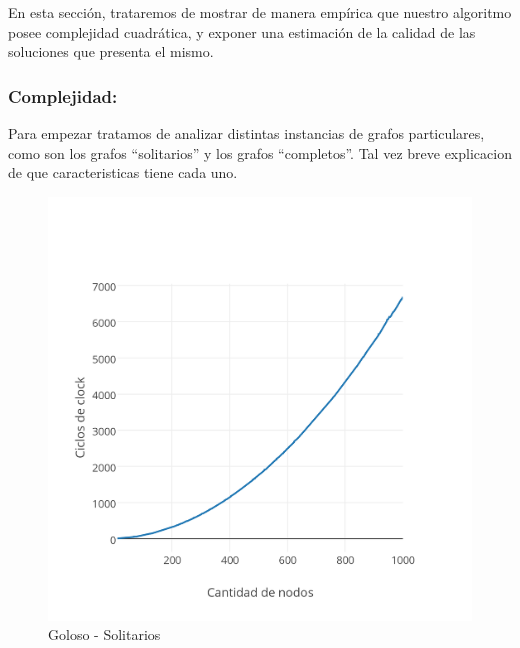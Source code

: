 En esta sección, trataremos de mostrar de manera empírica que nuestro algoritmo posee complejidad cuadrática, y exponer una estimación de la calidad de las soluciones que presenta el mismo.

\vspace*{0.6cm}

\subsubsection{Complejidad:}
\vspace*{0.3cm}

Para empezar tratamos de analizar distintas instancias de grafos particulares, como son los grafos ``solitarios'' y los grafos ``completos''. Tal vez breve explicacion de que caracteristicas tiene cada uno.

\begin{figure}[htb]
	\begin{center}
    		\includegraphics[scale=0.6]{imagenes/goloso-solitarios.png}
	\end{center}
	\caption{Goloso - Solitarios\label{fig:2A}}
\end{figure}


